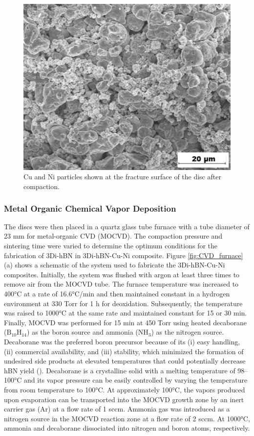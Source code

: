 \begin{figure}[!htb]
\centering
\includegraphics [scale=1.0]{graphics/chapter_2/Compacted_CuNi_powder}
\caption{Cu and Ni particles shown at the fracture surface of the disc after compaction.}
\label{fig:compact_fracture_surface}

\end{figure}
\subsubsection{Metal Organic Chemical Vapor Deposition}

The discs were then placed in a quartz glass tube furnace with a tube diameter of 23 mm for metal-organic CVD (MOCVD). The compaction pressure and sintering time were varied to determine the optimum conditions for the fabrication of 3Di-hBN in  3Di-hBN-Cu-Ni composite.
Figure \ref{fig:CVD_furnace} (a) shows a schematic of the system used to fabricate the 3Di-hBN-Cu-Ni composites. Initially, the system was flushed with argon at least three times to remove air from the MOCVD tube. The furnace temperature was increased to 400°C at a rate of 16.6°C/min and then maintained constant in a hydrogen environment at 330 Torr for 1 h for deoxidation. Subsequently, the temperature was raised to 1000°C at the same rate and maintained constant for 15 or 30 min. Finally, MOCVD was performed for 15 min at 450 Torr using heated decaborane ($\text{B}_{10}\text{H}_{14}$) as the boron source and ammonia (N$\text{H}_{3}$) as the nitrogen source. Decaborane was the preferred boron precursor because of its (i) easy handling, (ii) commercial availability, and (iii) stability, which minimized the formation of undesired side products at elevated temperatures that could potentially decrease hBN yield (\cite{chatterjee2012syntheses}). Decaborane is a crystalline solid with a melting temperature of 98–100°C and its vapor pressure can be easily controlled by varying the temperature from room temperature to 100°C. At approximately 100°C, the vapors produced upon evaporation can be transported into the MOCVD growth zone by an inert carrier gas (Ar) at a flow rate of 1 sccm. Ammonia gas was introduced as a nitrogen source in the MOCVD reaction zone at a flow rate of 2 sccm. At 1000°C, ammonia and decaborane dissociated into nitrogen and boron atoms, respectively.

